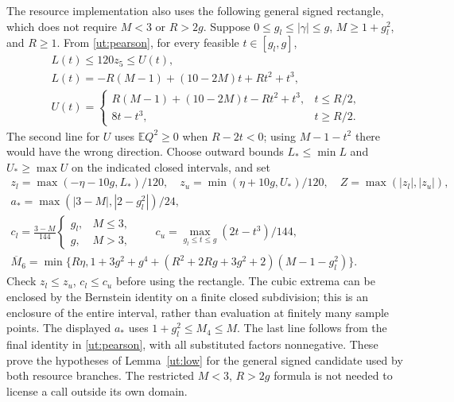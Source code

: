 \documentclass[aop,preprint]{imsart}
\theoremstyle{definition}
\newcommand{\E}{\mathbb E}
\numberwithin{equation}{section}
\begin{document}
The resource implementation also uses the following general signed
rectangle, which does not require $M<3$ or $R>2g$.
Suppose $0\le g_l\le|\gamma|\le g$, $M\ge1+g_l^2$, and $R\ge1$.
From \eqref{ut:pearson}, for every feasible $t\in[g_l,g]$,
\begin{gather*}
 L(t)\le120z_5\le U(t),\\
 L(t)=-R(M-1)+(10-2M)t+Rt^2+t^3,\\
 U(t)=\begin{cases}
 R(M-1)+(10-2M)t-Rt^2+t^3,&t\le R/2,\\
 8t-t^3,&t\ge R/2.
 \end{cases}
\end{gather*}
The second line for $U$ uses $\E Q^2\ge0$ when $R-2t<0$;
using $M-1-t^2$ there would have the wrong direction.
Choose outward bounds $L_*\le\min L$ and $U_*\ge\max U$ on the
indicated closed intervals, and set
\begin{gather*}
 z_l=\max(-\eta-10g,L_*)/120,\quad
 z_u=\min(\eta+10g,U_*)/120,\quad Z=\max(|z_l|,|z_u|),\\
 a_* =\max(|3-M|,|2-g_l^2|)/24,\\
 c_l=\frac{3-M}{144}
       \begin{cases}g_l,&M\le3,\\g,&M>3,\end{cases}
 \qquad c_u=\max_{g_l\le t\le g}(2t-t^3)/144,\\
 \overline M_6=\min\{R\eta,
  1+3g^2+g^4+(R^2+2Rg+3g^2+2)(M-1-g_l^2)\}.
\end{gather*}
Check $z_l\le z_u$, $c_l\le c_u$ before using the rectangle.
The cubic extrema can be enclosed by the Bernstein identity on a
finite closed subdivision; this is an enclosure of the entire
interval, rather than evaluation at finitely many sample points.
The displayed $a_*$ uses $1+g_l^2\le M_4\le M$.
The last line follows from the final identity in \eqref{ut:pearson},
with all substituted factors nonnegative. These prove the hypotheses
of Lemma~\ref{ut:low} for the general signed candidate used by both
resource branches. The restricted $M<3$, $R>2g$ formula is not needed
to license a call outside its own domain.
\end{document}
